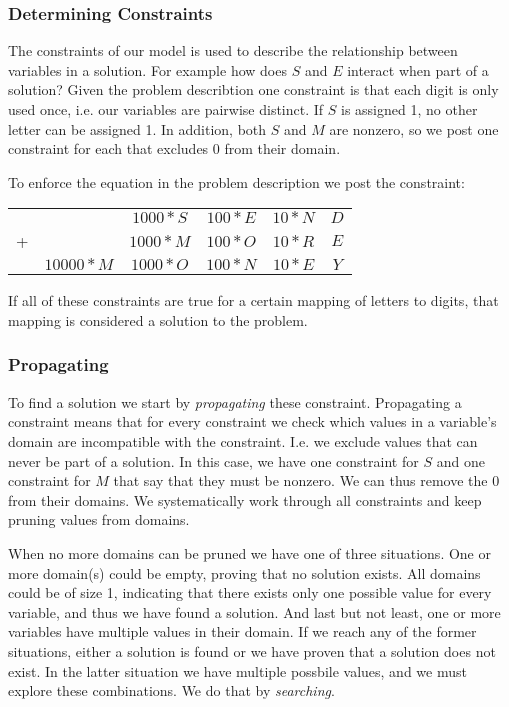 \subsubsection{Determining Constraints}

The constraints of our model is used to describe the relationship between variables in a
solution. For example how does $S$ and $E$ interact when part of a solution? Given the
problem describtion one constraint is that each digit is only used once, i.e. our variables
are pairwise distinct. If $S$ is assigned 1, no other letter can be assigned 1. In addition,
both $S$ and $M$ are nonzero, so we post one constraint for each that excludes 0 from their
domain.

To enforce the equation in the problem description we post the constraint: \\

\begin{tabular}{cccccc}
	& & $1000 * S$ & $100 * E$ & $10 * N$ & $D$ \\
	+ &	& $1000 * M$ & $100 * O$ & $10 * R$ & $E$ \\
	\hline
	& $10000 * M$ & $1000 * O$ & $100 * N$ & $10 * E$ & $Y$
\end{tabular}

If all of these constraints are true for a certain mapping of letters to digits, that
mapping is considered a solution to the problem.

\subsubsection{Propagating}

To find a solution we start by \textit{propagating} these constraint. Propagating a constraint
means that for every constraint we check which values in a variable's domain are incompatible
with the constraint. I.e. we exclude values that can never be part of a solution. In this
case, we have one constraint for $S$ and one constraint for $M$ that say that they must
be nonzero. We can thus remove the 0 from their domains. We systematically work through
all constraints and keep pruning values from domains.


When no more domains can be pruned we have one of three situations. One or more domain(s)
could be empty, proving that no solution exists. All domains could be of size 1, indicating
that there exists only one possible value for every variable, and thus we have found a
solution. And last but not least, one or more variables have multiple values in their
domain. If we reach any of the former situations, either a solution is found or we have proven
that a solution does not exist. In the latter situation we have multiple possbile values,
and we must explore these combinations. We do that by \textit{searching}.

